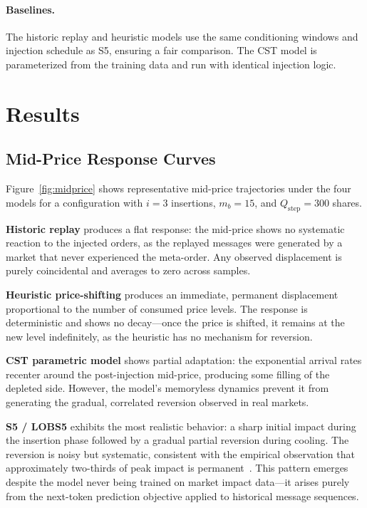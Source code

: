 \documentclass[sigplan,screen,anonymous]{acmart}
\begin{document}
\paragraph{Baselines.} The historic replay and heuristic models use the same conditioning windows and injection schedule as S5, ensuring a fair comparison. The CST model is parameterized from the training data and run with identical injection logic.


\section{Results}
\label{sec:results}

\subsection{Mid-Price Response Curves}
\label{sec:midprice}

Figure~\ref{fig:midprice} shows representative mid-price trajectories under the four models for a configuration with $i=3$ insertions, $m_b=15$, and $Q_{\text{step}}=300$ shares.

\textbf{Historic replay} produces a flat response: the mid-price shows no systematic reaction to the injected orders, as the replayed messages were generated by a market that never experienced the meta-order. Any observed displacement is purely coincidental and averages to zero across samples.

\textbf{Heuristic price-shifting} produces an immediate, permanent displacement proportional to the number of consumed price levels. The response is deterministic and shows no decay---once the price is shifted, it remains at the new level indefinitely, as the heuristic has no mechanism for reversion.

\textbf{CST parametric model} shows partial adaptation: the exponential arrival rates recenter around the post-injection mid-price, producing some filling of the depleted side. However, the model's memoryless dynamics prevent it from generating the gradual, correlated reversion observed in real markets.

\textbf{S5 / LOBS5} exhibits the most realistic behavior: a sharp initial impact during the insertion phase followed by a gradual partial reversion during cooling. The reversion is noisy but systematic, consistent with the empirical observation that approximately two-thirds of peak impact is permanent~\cite{bouchaud2018trades}. This pattern emerges despite the model never being trained on market impact data---it arises purely from the next-token prediction objective applied to historical message sequences.
\end{document}
